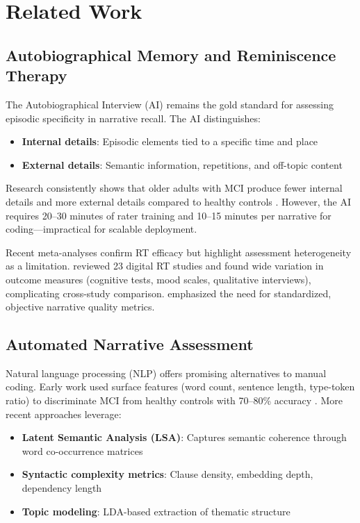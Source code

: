 \documentclass[11pt]{article}
\begin{document}
\section{Related Work}
\label{sec:related-work}

\subsection{Autobiographical Memory and Reminiscence Therapy}

The Autobiographical Interview (AI) \citep{levine2002} remains the gold standard for assessing episodic specificity in narrative recall. The AI distinguishes:
\begin{itemize}
    \item \textbf{Internal details}: Episodic elements tied to a specific time and place
    \item \textbf{External details}: Semantic information, repetitions, and off-topic content
\end{itemize}

Research consistently shows that older adults with MCI produce fewer internal details and more external details compared to healthy controls \citep{fraser2015,devito2025}. However, the AI requires 20--30 minutes of rater training and 10--15 minutes per narrative for coding---impractical for scalable deployment.

Recent meta-analyses confirm RT efficacy but highlight assessment heterogeneity as a limitation. \citet{pu2025} reviewed 23 digital RT studies and found wide variation in outcome measures (cognitive tests, mood scales, qualitative interviews), complicating cross-study comparison. \citet{ni2026} emphasized the need for standardized, objective narrative quality metrics.

\subsection{Automated Narrative Assessment}

Natural language processing (NLP) offers promising alternatives to manual coding. Early work used surface features (word count, sentence length, type-token ratio) to discriminate MCI from healthy controls with 70--80\% accuracy \citep{fraser2015}. More recent approaches leverage:

\begin{itemize}
    \item \textbf{Latent Semantic Analysis (LSA)}: Captures semantic coherence through word co-occurrence matrices \citep{thomas2025}
    \item \textbf{Syntactic complexity metrics}: Clause density, embedding depth, dependency length \citep{lu2025}
    \item \textbf{Topic modeling}: LDA-based extraction of thematic structure \citep{zhang2025}
\end{itemize}
\end{document}
